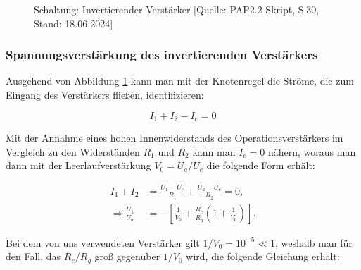 \documentclass{article}
\begin{document}
\begin{figure}[!b]
    \centering
    \caption{Schaltung: Invertierender Verstärker [Quelle: PAP2.2 Skript, S.30, Stand: 18.06.2024]}
    \label{fig:invVerstärker}
\end{figure}


\newpage
\subsubsection{Spannungsverstärkung des invertierenden Verstärkers}

Ausgehend von Abbildung \ref{fig:invVerstärker} kann man mit der Knotenregel die Ströme, die zum Eingang des Verstärkers fließen, identifizieren:

\begin{equation}
    I_1 + I_2 - I_e = 0
\end{equation}

Mit der Annahme eines hohen Innenwiderstands des Operationsverstärkers im Vergleich zu den Widerständen $R_1$ und $R_2$ kann man $I_e = 0$ nähern, woraus man dann mit der Leerlaufverstärkung $V_0 = U_a/U_e$ die folgende Form erhält:

\begin{equation}
    \begin{split}
        I_1 + I_2 &= \frac{U_1 - U_e}{R_1} + \frac{U_a - U_e}{R_2} = 0, \\ 
        \Rightarrow \frac{U_1}{U_a} &= - \left[ \frac{1}{V_0} + \frac{R_e}{R_g} \left( 1 + \frac{1}{V_0} \right) \right].
    \end{split}
\end{equation}

Bei dem von uns verwendeten Verstärker gilt $1/V_0 = 10^{-5} \ll 1$, weshalb man für den Fall, das $R_e/R_g$ groß gegenüber $1/V_0$ wird, die folgende Gleichung erhält:
\end{document}
